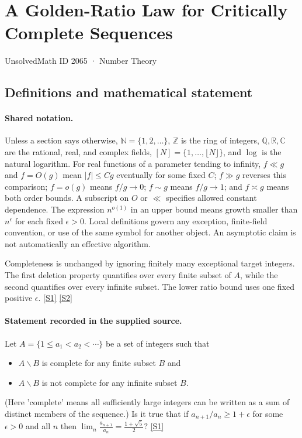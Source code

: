 \documentclass[11pt,a4paper]{article}
\newcommand{\N}{\mathbb{N}}
\newcommand{\Z}{\mathbb{Z}}
\newcommand{\Q}{\mathbb{Q}}
\newcommand{\R}{\mathbb{R}}
\newcommand{\C}{\mathbb{C}}
\newcommand{\sref}[2]{\hyperlink{source:#1:#2}{[S#2]}}
\begin{document}

\setcounter{section}{2064}

\section{A Golden-Ratio Law for Critically Complete Sequences}\label{2065}

{\small\sffamily UnsolvedMath ID 2065 · Number Theory}

\subsection{Definitions and mathematical statement}

\paragraph{Shared notation.}Unless a section says otherwise, $\N=\{1,2,\ldots\}$,
$\Z$ is the ring of integers, $\Q,\R,\C$ are the rational, real, and complex
fields, $[N]=\{1,\ldots,\lfloor N\rfloor\}$, and $\log$ is the natural
logarithm. For real functions of a parameter tending to infinity,
$f\ll g$ and $f=O(g)$ mean $|f|\leq Cg$ eventually for some fixed $C$;
$f\gg g$ reverses this comparison; $f=o(g)$ means $f/g\to0$;
$f\sim g$ means $f/g\to1$; and $f\asymp g$ means both order bounds.
A subscript on $O$ or $\ll$ specifies allowed constant dependence.
The expression $n^{o(1)}$ in an upper bound means growth smaller than
$n^\epsilon$ for each fixed $\epsilon>0$. Local definitions govern any
exception, finite-field convention, or use of the same symbol for another
object. An asymptotic claim is not automatically an effective algorithm.



Completeness is unchanged by ignoring finitely many exceptional target integers. The first deletion property quantifies over every finite subset of $A$, while the second quantifies over every infinite subset. The lower ratio bound uses one fixed positive $\epsilon$. \sref{2065}{1} \sref{2065}{2}

\paragraph{Statement recorded in the supplied source.}
Let $A=\{1\leq a_1< a_2<\cdots\}$ be a set of integers such that
\begin{itemize}
\item  $A\backslash B$ is complete for any finite subset $B$ and 
\item  $A\backslash B$ is not complete for any infinite subset $B$.
\end{itemize}
(Here 'complete' means all sufficiently large integers can be written as a sum of distinct members of the sequence.)
Is it true that if $a_{n+1}/a_n \geq 1+\epsilon$ for some $\epsilon>0$ and all $n$ then $ \lim_n \frac{a_{n+1}}{a_n}=\frac{1+\sqrt{5}}{2}? $ \sref{2065}{1}
\end{document}
